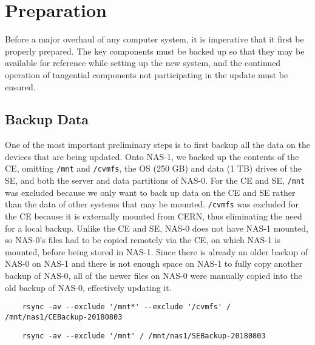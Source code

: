 \documentclass[12pt]{article}
\begin{document}


\section{Preparation}

\qq Before a major overhaul of any computer system, it is imperative that it
first be properly prepared. The key components must be backed up so that they
may be available for reference while setting up the new system, and the
continued operation of tangential components not participating in the update
must be ensured.

\subsection{Backup Data}

\qq One of the most important preliminary steps is to first backup all the data
on the devices that are being updated. Onto NAS-1, we backed up the contents of
the CE, omitting {\tt /mnt} and {\tt /cvmfs}, the OS (250 GB) and data (1 TB)
drives of the SE, and both the server and data partitions of NAS-0. For the CE
and SE, {\tt /mnt} was excluded because we only want to back up data on the CE
and SE rather than the data of other systems that may be mounted. {\tt /cvmfs}
was excluded for the CE because it is externally mounted from CERN, thus
eliminating the need for a local backup. Unlike the CE and SE, NAS-0 does not
have NAS-1 mounted, so NAS-0's files had to be copied remotely via the CE, on
which NAS-1 is mounted, before being stored in NAS-1. Since there is already an
older backup of NAS-0 on NAS-1 and there is not enough space on NAS-1 to fully
copy another backup of NAS-0, all of the newer files on NAS-0 were manually
copied into the old backup of NAS-0, effectively updating it.

\begin{tcolorbox}[title=Backup the CE (executed in CE), colback=white,
  colframe=black, coltitle=green]
  \begin{verbatim}
    rsync -av --exclude '/mnt*' --exclude '/cvmfs' / /mnt/nas1/CEBackup-20180803
  \end{verbatim}
\end{tcolorbox}

\begin{tcolorbox}[title=Backup the SE (executed in SE), colback=white,
  colframe=black, coltitle=green]
  \begin{verbatim}
    rsync -av --exclude '/mnt' / /mnt/nas1/SEBackup-20180803
  \end{verbatim}
\end{tcolorbox}
\end{document}
